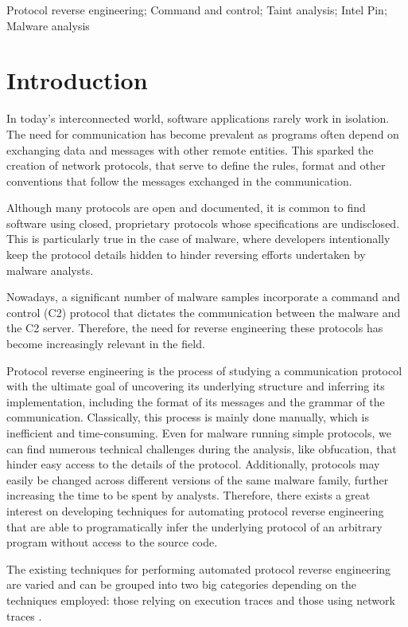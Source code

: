 \documentclass[conference]{IEEEtran}
\begin{document}
\begin{IEEEkeywords}
    Protocol reverse engineering; Command and control; Taint analysis; Intel Pin; Malware analysis 
\end{IEEEkeywords}

\section{Introduction}
In today's interconnected world, software applications rarely work in
isolation. The need for communication has become prevalent as programs often
depend on exchanging data and messages with other remote entities. This sparked
the creation of network protocols, that serve to define the rules, format and
other conventions that follow the messages exchanged in the communication.

Although many protocols are open and documented, it is common to find software
using closed, proprietary protocols whose specifications are undisclosed. This
is particularly true in the case of malware, where developers intentionally
keep the protocol details hidden to hinder reversing efforts undertaken by
malware analysts.

Nowadays, a significant number of malware samples incorporate a command and
control (C2) protocol that dictates the communication between the malware and
the C2 server. Therefore, the need for reverse engineering these protocols has
become increasingly relevant in the field.

Protocol reverse engineering is the process of studying a communication
protocol with the ultimate goal of uncovering its underlying structure and
inferring its implementation, including the format of its messages and the
grammar of the communication. Classically, this process is mainly done
manually, which is inefficient and time-consuming. Even for malware running
simple protocols, we can find numerous technical challenges during the
analysis, like obfucation, that hinder easy access to the details of the
protocol. Additionally, protocols may easily be changed across different
versions of the same malware family, further increasing the time to be spent by
analysts. Therefore, there exists a great interest on developing techniques for
automating protocol reverse engineering that are able to programatically infer
the underlying protocol of an arbitrary program without access to the source
code.

The existing techniques for performing automated protocol reverse engineering
are varied and can be grouped into two big categories depending on the
techniques employed: those relying on execution traces and those using network
traces \cite{sota_apre}\cite{sota_apre2}.
\end{document}
